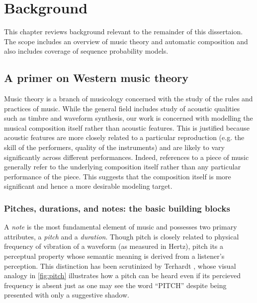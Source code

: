 \chapter{Background}



This chapter reviews background relevant to the remainder of this dissertaion.
The scope includes an overview of music theory and automatic composition
and also includes coverage of sequence probability models.

\section{A primer on Western music theory}

Music theory is a branch of musicology concerned with the study of the rules
and practices of music. While the general field includes study of acoustic
qualities such as timbre and waveform synthesis, our work is concerned with
modelling the musical composition itself rather than acoustic features. This is
justified because acoustic features are more closely related to a particular
reproduction (e.g. the skill of the performers, quality of the instruments) and
are likely to vary significantly across different performances. Indeed,
references to a piece of music generally refer to the underlying composition
itself rather than any particular performance of the piece. This suggests that
the composition itself is more significant and hence a more desirable modeling
target.

\subsection{Pitches, durations, and notes: the basic building blocks}

A \emph{note} is the most fundamental element of music and possesses two
primary attributes, a \emph{pitch} and a \emph{duration}. Though pitch is
closely related to physical frequency of vibration of a waveform (as measured
in Hertz), pitch its a perceptual property whose semantic meaning is derived
from a listener's perception. This distinction has been scrutinized by Terhardt
\cite{:/content/asa/journal/jasa/55/5/10.1121/1.1914648}, whose visual analogy
in \autoref{fig:pitch} illustrates how a pitch can be heard even if its
percieved frequency is absent just as one may see the word ``PITCH'' despite
being presented with only a suggestive shadow.

